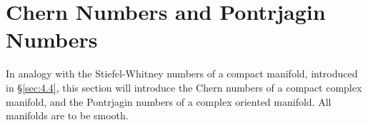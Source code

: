 \documentclass[../main]{subfiles}
\begin{document}
\chapter{Chern Numbers and Pontrjagin Numbers}\label{ch:16}
In analogy with the Stiefel-Whitney numbers of a compact manifold, introduced in \S\ref{sec:4.4}, this section will introduce the Chern numbers of a compact complex manifold, and the Pontrjagin numbers of a complex oriented manifold. All manifolds are to be smooth.







\end{document}
